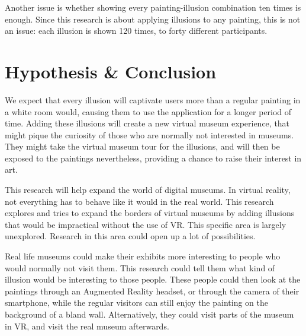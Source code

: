 \documentclass[a4paper]{article}
\begin{document}
Another issue is whether showing every painting-illusion combination ten times is enough. Since this research is about applying illusions to any painting, this is not an issue: each illusion is shown 120 times, to forty different participants.

\section {Hypothesis \& Conclusion}
We expect that every illusion will captivate users more than a regular painting in a white room would, causing them to use the application for a longer period of time. Adding these illusions will create a new virtual museum experience, that might pique the curiosity of those who are normally not interested in museums. They might take the virtual museum tour for the illusions, and will then be exposed to the paintings nevertheless, providing a chance to raise their interest in art. 

This research will help expand the world of digital museums. In virtual reality, not everything has to behave like it would in the real world. This research explores and tries to expand the borders of virtual museums by adding illusions that would be impractical without the use of VR. This specific area is largely unexplored. Research in this area could open up a lot of possibilities.

Real life museums could make their exhibits more interesting to people who would normally not visit them. This research could tell them what kind of illusion would be interesting to those people. These people could then look at the paintings through an Augmented Reality headset, or through the camera of their smartphone, while the regular visitors can still enjoy the painting on the background of a bland wall. Alternatively, they could visit parts of the museum in VR, and visit the real museum afterwards.
\end{document}

